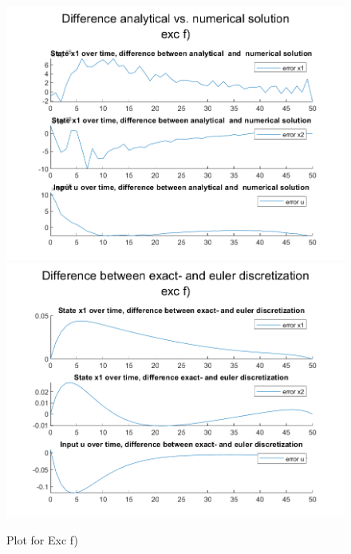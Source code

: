 \documentclass[]{article}
\begin{document}
\begin{figure}[H]
	\centering
	\includegraphics[width=0.95\linewidth]{plots/exc_f3.png}
	\includegraphics[width=0.95\linewidth]{plots/exc_f4.png}
	\caption{Plot for Exc f)}
	\label{fig:excf3}
\end{figure}
\end{document}
